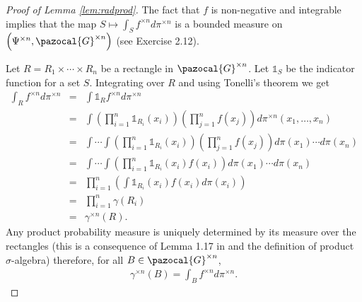 \documentclass[aos]{imsart}
\def\l{\left}
\def\r{\right}
\def\sG{\pazocal{G}}
\theoremstyle{plain}
\theoremstyle{defintion}
\begin{document}
	\begin{proof}[Proof of Lemma \ref{lem:radprod}]
		The fact that $f$ is non-negative and integrable implies that the map $S \mapsto \int_S f^{\times n}d\pi^{\times n}$ is a bounded measure on $\l(\Psi^{\times n}, \sG^{\times n}\r)$ (see \cite{folland99} Exercise 2.12). 

		Let $R= R_1 \times\cdots\times R_n$ be a rectangle in $\sG^{\times n}$. Let $\mathds{1}_S$ be the indicator function for a set $S$. Integrating over $R$ and using Tonelli's theorem we get
		\begin{eqnarray*}
			\int_R f^{\times n} d \pi^{\times n}
			&=& \int \mathds{1}_Rf^{\times n}d \pi^{\times n}\\
		 &=& \int \l(\prod_{i=1}^n \mathds{1}_{R_i}(x_i)\r)\l(\prod_{j=1}^n f(x_j)\r)d \pi^{\times n}\left( x_1,\ldots,x_n \right)\\
		 &=& \int\cdots\int \l(\prod_{i=1}^n \mathds{1}_{R_i}(x_i)\r)\l(\prod_{j=1}^n f(x_j)\r)d \pi(x_1)\cdots d\pi(x_n)\\
		 &=& \int\cdots\int \l(\prod_{i=1}^n \mathds{1}_{R_i}(x_i) f(x_i)\r)d \pi(x_1)\cdots d\pi(x_n)\\
		 &=&  \prod_{i=1}^n\l(\int \mathds{1}_{R_i}(x_i) f(x_i)d \pi(x_i)\r)\\
		 &=&  \prod_{i=1}^n\gamma(R_i)\\
		 &=&  \gamma^{\times n}(R).
		\end{eqnarray*}
		Any product probability measure is uniquely determined by its measure over the rectangles (this is a consequence of Lemma 1.17 in \cite{fomp} and the definition of product $\sigma$-algebra) therefore, for all $B\in \sG^{\times n}$,
		\begin{eqnarray*}
			\gamma^{\times n}\left( B \right) = \int_B f^{\times n} d\pi^{\times n}.
		\end{eqnarray*}

	\end{proof}



	
\end{document}
